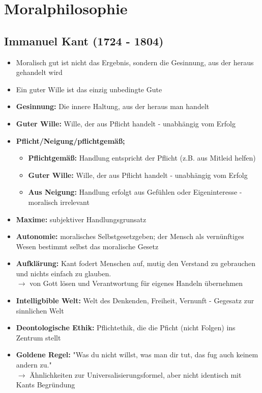 
\section{Moralphilosophie}


\subsection{Immanuel Kant (1724 - 1804)}
\begin{itemize}
    \item Moralisch gut ist nicht das Ergebnis, sondern die Gesinnung, aus der heraus gehandelt wird
    \item Ein guter Wille ist das einzig unbedingte Gute
\end{itemize}

\begin{itemize}
    \item \textbf{Gesinnung:} Die innere Haltung, aus der heraus man handelt
    \item \textbf{Guter Wille:} Wille, der aus Pflicht handelt - unabhängig vom Erfolg
    \item \textbf{Pflicht/Neigung/pflichtgemäß;}
    \begin{itemize}
        \item \textbf{Pflichtgemäß:} Handlung entspricht der Pflicht (z.B. aus Mitleid helfen)
        \item \textbf{Guter Wille:} Wille, der aus Pflicht handelt - unabhängig vom Erfolg
        \item \textbf{Aus Neigung:} Handlung erfolgt aus Gefühlen oder Eigeninteresse - moralisch irrelevant
    \end{itemize}
    \item \textbf{Maxime:} subjektiver Handlungsgrunsatz
    \item \textbf{Autonomie:} moralisches Selbstgesetzgeben; der Mensch als vernünftiges Wesen bestimmt selbst das moralische Gesetz
    \item \textbf{Aufklärung:} Kant fodert Menschen auf, mutig den Verstand zu gebrauchen und nichts einfach zu glauben. \\
    $\rightarrow$ von Gott lösen und Verantwortung für eigenes Handeln übernehmen
    \item \textbf{Intelligbible Welt:} Welt des Denkenden, Freiheit, Vernunft - Gegesatz zur sinnlichen Welt
    \item \textbf{Deontologische Ethik:} Pflichtethik, die die Pficht (nicht Folgen) ins Zentrum stellt
    \item \textbf{Goldene Regel:} "Was du nicht willst, was man dir tut, das fug auch keinem andern zu." \\
    $\rightarrow$ Ähnlichkeiten zur Universalisierungsformel, aber nicht identisch mit Kants Begründung
\end{itemize}

